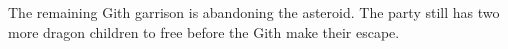 The remaining Gith garrison is abandoning the asteroid.
The party still has two more dragon children to free before the Gith make their escape.